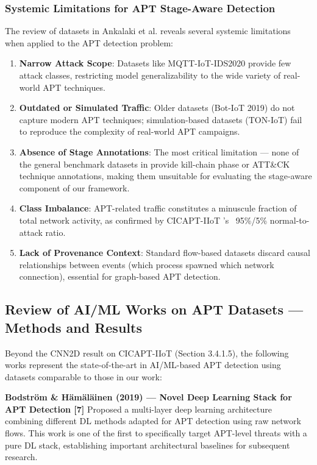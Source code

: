 \subsubsection{Systemic Limitations for APT Stage-Aware Detection}

The review of datasets in Ankalaki et al. \cite{ankalaki2025cyber} reveals several systemic limitations when applied to the APT detection problem:

\begin{enumerate}
\item \textbf{Narrow Attack Scope}: Datasets like MQTT-IoT-IDS2020 provide few attack classes, restricting model generalizability to the wide variety of real-world APT techniques.
\item \textbf{Outdated or Simulated Traffic}: Older datasets (Bot-IoT 2019) do not capture modern APT techniques; simulation-based datasets (TON-IoT) fail to reproduce the complexity of real-world APT campaigns.
\item \textbf{Absence of Stage Annotations}: The most critical limitation — none of the general benchmark datasets in \cite{ankalaki2025cyber} provide kill-chain phase or ATT\&CK technique annotations, making them unsuitable for evaluating the stage-aware component of our framework.
\item \textbf{Class Imbalance}: APT-related traffic constitutes a minuscule fraction of total network activity, as confirmed by CICAPT-IIoT \cite{ghiasvand2024cicapt}'s ~95\%/5\% normal-to-attack ratio.
\item \textbf{Lack of Provenance Context}: Standard flow-based datasets discard causal relationships between events (which process spawned which network connection), essential for graph-based APT detection.
\end{enumerate}

\subsection{Review of AI/ML Works on APT Datasets — Methods and Results}

Beyond the CNN2D result on CICAPT-IIoT \cite{ghiasvand2024cicapt} (Section 3.4.1.5), the following works represent the state-of-the-art in AI/ML-based APT detection using datasets comparable to those in our work:

\textbf{Bodström \& Hämäläinen (2019) — Novel Deep Learning Stack for APT Detection [7]}  
Proposed a multi-layer deep learning architecture combining different DL methods adapted for APT detection using raw network flows. This work is one of the first to specifically target APT-level threats with a pure DL stack, establishing important architectural baselines for subsequent research.


